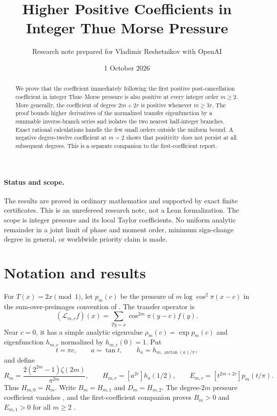 \documentclass[11pt,a4paper]{article}
\title{Higher Positive Coefficients in Integer Thue Morse Pressure}
\author{Research note prepared for Vladimir Reshetnikov with OpenAI}
\date{1 October 2026}
\theoremstyle{remark}\newtheorem*{ednote}{Editorial note (ProveIt, 2026-10-01)}
\newcommand{\Lop}{\mathcal L}\newcommand{\ii}{\mathrm i}
\begin{document}
\maketitle
\begin{abstract}
We prove that the coefficient immediately following the first positive post-cancellation coefficient in integer Thue--Morse pressure is also positive at every integer order $m\ge2$. More generally, the coefficient of degree $2m+2r$ is positive whenever $m\ge3r$. The proof bounds higher derivatives of the normalized transfer eigenfunction by a summable inverse-branch series and isolates the two nearest half-integer branches. Exact rational calculations handle the few small orders outside the uniform bound. A negative degree-twelve coefficient at $m=2$ shows that positivity does not persist at all subsequent degrees. This is a separate companion to the first-coefficient report.
\end{abstract}

\paragraph{Status and scope.}
The results are proved in ordinary mathematics and supported by exact finite certificates. This is an unrefereed research note, not a Lean formalization. The scope is integer pressure and its local Taylor coefficients. No uniform analytic remainder in a joint limit of phase and moment order, minimum sign-change degree in general, or worldwide priority claim is made.

\section{Notation and results}
For $T(x)=2x\pmod1$, let $p_m(c)$ be the pressure of
$m\log\cos^2\!\pi(x-c)$ in the sum-over-preimages convention of \cite{integer}. The transfer operator is
\[
 (\Lop_{m,c}f)(x)=\sum_{Ty=x}\cos^{2m}\!\pi(y-c)f(y).
\]
Near $c=0$, it has a simple analytic eigenvalue $\rho_m(c)=\exp p_m(c)$ and eigenfunction $h_{m,c}$ normalized by $h_{m,c}(0)=1$. Put
\[
 t=\pi c,\qquad a=\tan t,\qquad h_a=h_{m,\arctan(a)/\pi},
\]
and define
\[
 R_m=\frac{2(2^{2m}-1)\zeta(2m)}{\pi^{2m}},\qquad
 H_{m,r}=[a^{2r}]h_a(1/2),\qquad
 E_{m,r}=[t^{2m+2r}]p_m(t/\pi).
\]
Thus $H_{m,0}=R_m$. Write $B_m=H_{m,1}$ and $D_m=H_{m,2}$.
The degree-$2m$ pressure coefficient vanishes \cite{integer}, and the first-coefficient companion proves $B_m>0$ and $E_{m,1}>0$ for all $m\ge2$ \cite{first}.
\end{document}
